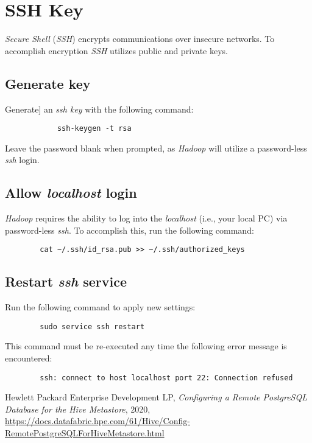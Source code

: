\documentclass{article}
\begin{document}
\section{SSH Key}
\emph{Secure Shell} (\emph{SSH}) encrypts communications over insecure networks. To accomplish encryption
\emph{SSH} utilizes public and private keys.

    \subsection{Generate key}
     Generate] an \emph{ssh key} with the following command:
        \begin{verbatim}
            ssh-keygen -t rsa
        \end{verbatim}
    Leave the password blank when prompted, as \emph{Hadoop} will utilize a password-less \emph{ssh}
    login.

    \subsection{Allow \emph{localhost} login}
    \emph{Hadoop} requires the ability to log into the \emph{localhost} (i.e., your local PC) via
    password-less \emph{ssh}. To accomplish this, run the following command:
    \begin{verbatim}
        cat ~/.ssh/id_rsa.pub >> ~/.ssh/authorized_keys
    \end{verbatim}

    \subsection{Restart \emph{ssh} service}
    Run the following command to apply new settings:
    \begin{verbatim}
        sudo service ssh restart
    \end{verbatim}
    This command must be re-executed any time the following error message is encountered:
    \begin{verbatim}
        ssh: connect to host localhost port 22: Connection refused
    \end{verbatim}

\newpage
\begin{thebibliography}{9}

        Hewlett Packard Enterprise Development LP,
        \textit{Configuring a Remote PostgreSQL Database for the Hive Metastore},
        2020,
        \url{https://docs.datafabric.hpe.com/61/Hive/Config-RemotePostgreSQLForHiveMetastore.html}
\end{thebibliography}
\end{document}
